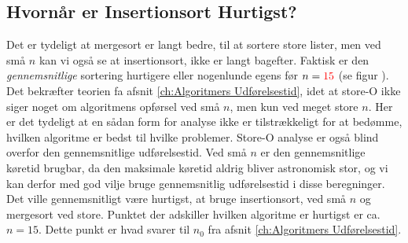 \subsection{Hvornår er Insertionsort Hurtigst?}%
\label{sub:Store-O er Værste Tilfælde}
Det er tydeligt at mergesort er langt bedre, til at sortere store lister, men ved små $n$ kan vi også se at insertionsort, ikke er langt bagefter. Faktisk er den \emph{gennemsnitlige} sortering hurtigere eller nogenlunde egens før $n = \color{red}15\color{black}$ (se figur ). Det bekræfter teorien fa afsnit \ref{ch:Algoritmers Udførelsestid}, idet at store-O ikke siger noget om algoritmens opførsel ved små $n$, men kun ved meget store $n$. Her er det tydeligt at en sådan form for analyse ikke er tilstrækkeligt for at bedømme, hvilken algoritme er bedst til hvilke problemer. Store-O analyse er også blind overfor den gennemsnitlige udførelsestid. Ved små $n$ er den gennemsnitlige køretid brugbar, da den maksimale køretid aldrig bliver astronomisk stor, og vi kan derfor med god vilje bruge gennemsnitlig udførelsestid i disse beregninger. Det ville gennemsnitligt være hurtigst, at bruge insertionsort, ved små $n$ og mergesort ved store. Punktet der adskiller hvilken algoritme er hurtigst er ca. $n = 15$. Dette punkt er hvad svarer til $n_0$ fra afsnit \ref{ch:Algoritmers Udførelsestid}.




